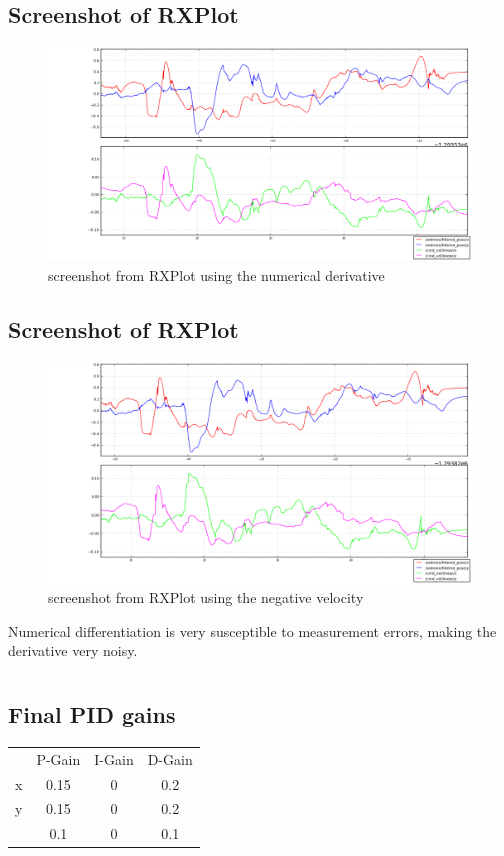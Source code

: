 \documentclass[14pt,a4paper]{article}
\begin{document}
	\subsection{Screenshot of RXPlot}
		\begin{figure}[htbp]
	\centering
	\includegraphics[width=\textwidth]{rxplot01.png}
  	\caption{screenshot from RXPlot using the numerical derivative}
    \label{graph:RVIZ control}
	\end{figure}
	
		\subsection{Screenshot of RXPlot}
		\begin{figure}[htbp]
	\centering
	\includegraphics[width=\textwidth]{rxplot02.png}
  	\caption{screenshot from RXPlot using the negative velocity}
    \label{graph:RVIZ control}
	\end{figure}
	Numerical differentiation is very susceptible to measurement errors, making the derivative very noisy.
	
	\section{}
	
	\subsection{Final PID gains}
	
	\begin{center}
		\begin{tabular}{r c c c}
					& P-Gain 	& I-Gain 	& D-Gain\\
			x 	& 0.15		& 0				&	0.2  \\
			y 	& 0.15		& 0				& 0.2		\\
			\phi& 0.1			& 0				& 0.1
		\end{tabular}
	\end{center}
	
	
	
	
\end{document}

